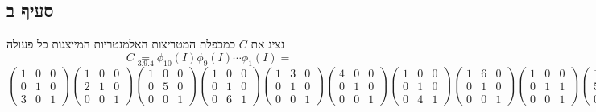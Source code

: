 \documentclass{article}
\newcommand\underrel[2]{\mathrel{\mathop{#2}\limits_{#1}}}
\begin{document}
\subsection*{סעיף ב}

נציג את $C$ כמכפלת המטריצות האלמנטריות המייצגות כל פעולה
\[
    C \underrel{3.9.4}{=}
    \phi_{10}(I)\phi_9(I)\cdots\phi_1(I) =
\]
\[
    \begin{pmatrix}
        1 & 0 & 0 \\
        0 & 1 & 0 \\
        3 & 0 & 1
    \end{pmatrix}
    \begin{pmatrix}
        1 & 0 & 0 \\
        2 & 1 & 0 \\
        0 & 0 & 1
    \end{pmatrix}
    \begin{pmatrix}
        1 & 0 & 0 \\
        0 & 5 & 0 \\
        0 & 0 & 1
    \end{pmatrix}
    \begin{pmatrix}
        1 & 0 & 0 \\
        0 & 1 & 0 \\
        0 & 6 & 1
    \end{pmatrix}
    \begin{pmatrix}
        1 & 3 & 0 \\
        0 & 1 & 0 \\
        0 & 0 & 1
    \end{pmatrix}
    \begin{pmatrix}
        4 & 0 & 0 \\
        0 & 1 & 0 \\
        0 & 0 & 1
    \end{pmatrix}
    \begin{pmatrix}
        1 & 0 & 0 \\
        0 & 1 & 0 \\
        0 & 4 & 1
    \end{pmatrix}
    \begin{pmatrix}
        1 & 6 & 0 \\
        0 & 1 & 0 \\
        0 & 0 & 1
    \end{pmatrix}
    \begin{pmatrix}
        1 & 0 & 0 \\
        0 & 1 & 1 \\
        0 & 0 & 1
    \end{pmatrix}
    \begin{pmatrix}
        1 & 0 & 0 \\
        5 & 1 & 0 \\
        0 & 0 & 1
    \end{pmatrix}
\]
\end{document}
